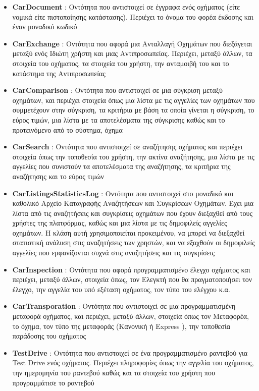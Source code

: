 \documentclass{../ol-softwaremanual}
\begin{document}
\begin{itemize}
		\item \en \textbf{CarDocument} \gr : Οντότητα που αντιστοιχεί σε έγγραφα ενός οχήματος (είτε νομικά είτε πιστοποίησης κατάστασης). Περιέχει το όνομα του φορέα έκδοσης και έναν μοναδικό κωδικό
		\item \en \textbf{CarExchange} \gr : Οντότητα που αφορά μια Ανταλλαγή Οχημάτων που διεξάγεται μεταξύ ενός Ιδιώτη χρήστη και μιας Αντιπροσωπείας. Περιέχει, μεταξύ άλλων, τα στοιχεία του οχήματος, τα στοιχεία του χρήστη, την ανταμοιβή του και το κατάστημα της Αντιπροσωπείας 
		\item \en \textbf{CarComparison} \gr : Οντότητα που αντιστοιχεί σε μια σύγκριση μεταξύ οχημάτων, και περιέχει στοιχεία όπως μια λίστα με τις αγγελίες των οχημάτων που συμμετέχουν στην σύγκριση, τα κριτήρια με βάση τα οποία γίνεται η σύγκριση, το εύρος τιμών, μια λίστα με τα αποτελέσματα της σύγκρισης καθώς και το προτεινόμενο από το σύστημα, όχημα
		\item \en \textbf{CarSearch} \gr : Οντότητα που αντιστοιχεί σε αναζήτησης οχήματος και περιέχει στοιχεία όπως την τοποθεσία του χρήστη, την ακτίνα αναζήτησης, μια λίστα με τις αγγελίες που συνιστούν τα αποτελέσματα της αναζήτησης, τα κριτήρια της αναζήτησης και το εύρος τιμών		
		\item \en \textbf{CarListingsStatisticsLog} \gr : Οντότητα που αντιστοιχεί στο μοναδικό και καθολικό Αρχείο Καταγραφής Αναζητήσεων και Συγκρίσεων Οχημάτων. Έχει μια λίστα από τις αναζητήσεις και συγκρίσεις οχημάτων που έχουν διεξαχθεί από τους χρήστες της πλατφόρμας, καθώς και μια λίστα με τις δημοφιλείς αγγελίες οχημάτων. Η κλάση αυτή χρησιμοποιείται προκειμένου, να μπορεί να διεξαχθεί στατιστική ανάλυση στις αναζητήσεις των χρηστών, και να εξαχθούν οι δημοφιλείς αγγελίες που εμφανίζονται συχνά στις αναζητήσεις και τις συγκρίσεις		
		\item \en \textbf{CarInspection} \gr : Οντότητα που αφορά προγραμματισμένο έλεγχο οχήματος και περιέχει, μεταξύ άλλων, στοιχεία όπως, τον Ελεγκτή που θα πραγματοποιήσει τον έλεγχο, την αγγελία του υπό εξέταση οχήματος, τον τύπο του ελέγχου κ.α.
		\item \en \textbf{CarTransporation} \gr : Οντότητα που αντιστοιχεί σε μια προγραμματισμένη μεταφορά οχήματος, και περιέχει, μεταξύ άλλων, στοιχεία όπως τον Μεταφορέα, το όχημα, τον τύπο της μεταφοράς (Κανονική ή \en Express \gr), την τοποθεσία παράδοσης του οχήματος
		\item \en \textbf{TestDrive} \gr : Οντότητα που αντιστοιχεί σε ένα προγραμματισμένο ραντεβού για \en Test Drive \gr ενός οχήματος. Περιέχει πληροφορίες όπως την αγγελία του οχήματος, την ημερομηνία του ραντεβού καθώς και τα στοιχεία του χρήστη που προγραμμάτισε το ραντεβού

\end{itemize}
\end{document}
